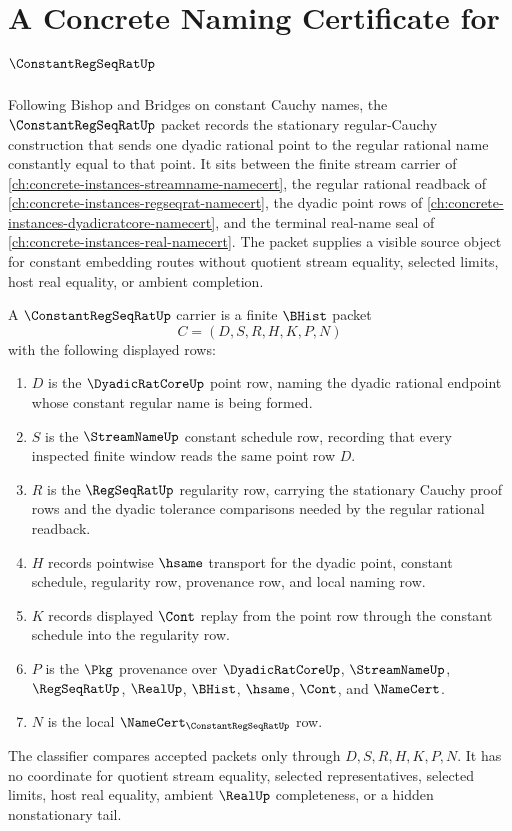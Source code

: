 \chapter{A Concrete Naming Certificate for $\ConstantRegSeqRatUp$}
\label{ch:concrete-instances-constant-regseqrat-namecert}

Following Bishop and Bridges on constant Cauchy names, the $\ConstantRegSeqRatUp$ packet records the stationary regular-Cauchy construction that sends one dyadic rational point to the regular rational name constantly equal to that point. It sits between the finite stream carrier of \autoref{ch:concrete-instances-streamname-namecert}, the regular rational readback of \autoref{ch:concrete-instances-regseqrat-namecert}, the dyadic point rows of \autoref{ch:concrete-instances-dyadicratcore-namecert}, and the terminal real-name seal of \autoref{ch:concrete-instances-real-namecert}. The packet supplies a visible source object for constant embedding routes without quotient stream equality, selected limits, host real equality, or ambient completion.

\begin{definition}
\label{def:constant-regseqrat-carrier}
A $\ConstantRegSeqRatUp$ carrier is a finite $\BHist$ packet
$$
C=(D,S,R,H,K,P,N)
$$
with the following displayed rows:
\begin{enumerate}
\item $D$ is the $\DyadicRatCoreUp$ point row, naming the dyadic rational endpoint whose constant regular name is being formed.
\item $S$ is the $\StreamNameUp$ constant schedule row, recording that every inspected finite window reads the same point row $D$.
\item $R$ is the $\RegSeqRatUp$ regularity row, carrying the stationary Cauchy proof rows and the dyadic tolerance comparisons needed by the regular rational readback.
\item $H$ records pointwise $\hsame$ transport for the dyadic point, constant schedule, regularity row, provenance row, and local naming row.
\item $K$ records displayed $\Cont$ replay from the point row through the constant schedule into the regularity row.
\item $P$ is the $\Pkg$ provenance over $\DyadicRatCoreUp$, $\StreamNameUp$, $\RegSeqRatUp$, $\RealUp$, $\BHist$, $\hsame$, $\Cont$, and $\NameCert$.
\item $N$ is the local $\NameCert_{\ConstantRegSeqRatUp}$ row.
\end{enumerate}
The classifier compares accepted packets only through $D,S,R,H,K,P,N$. It has no coordinate for quotient stream equality, selected representatives, selected limits, host real equality, ambient $\RealUp$ completeness, or a hidden nonstationary tail.
\end{definition}

